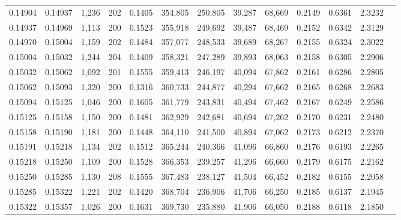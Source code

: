\begin{tabular}{rrrrrrrrrrrrr}
0.14904 & 0.14937 & 1,236 & 202 &                                     0.1405 & 354,805 & 250,805 &  39,287 &  68,669 & 0.2149 & 0.6361 & 2.3232 \\
0.14937 & 0.14969 & 1,113 & 200 &                                     0.1523 & 355,918 & 249,692 &  39,487 &  68,469 & 0.2152 & 0.6342 & 2.3129 \\
0.14970 & 0.15004 & 1,159 & 202 &                                     0.1484 & 357,077 & 248,533 &  39,689 &  68,267 & 0.2155 & 0.6324 & 2.3022 \\
0.15004 & 0.15032 & 1,244 & 204 &                                     0.1409 & 358,321 & 247,289 &  39,893 &  68,063 & 0.2158 & 0.6305 & 2.2906 \\
0.15032 & 0.15062 & 1,092 & 201 &                                     0.1555 & 359,413 & 246,197 &  40,094 &  67,862 & 0.2161 & 0.6286 & 2.2805 \\
0.15062 & 0.15093 & 1,320 & 200 &                                     0.1316 & 360,733 & 244,877 &  40,294 &  67,662 & 0.2165 & 0.6268 & 2.2683 \\
0.15094 & 0.15125 & 1,046 & 200 &                                     0.1605 & 361,779 & 243,831 &  40,494 &  67,462 & 0.2167 & 0.6249 & 2.2586 \\
0.15125 & 0.15158 & 1,150 & 200 &                                     0.1481 & 362,929 & 242,681 &  40,694 &  67,262 & 0.2170 & 0.6231 & 2.2480 \\
0.15158 & 0.15190 & 1,181 & 200 &                                     0.1448 & 364,110 & 241,500 &  40,894 &  67,062 & 0.2173 & 0.6212 & 2.2370 \\
0.15191 & 0.15218 & 1,134 & 202 &                                     0.1512 & 365,244 & 240,366 &  41,096 &  66,860 & 0.2176 & 0.6193 & 2.2265 \\
0.15218 & 0.15250 & 1,109 & 200 &                                     0.1528 & 366,353 & 239,257 &  41,296 &  66,660 & 0.2179 & 0.6175 & 2.2162 \\
0.15250 & 0.15285 & 1,130 & 208 &                                     0.1555 & 367,483 & 238,127 &  41,504 &  66,452 & 0.2182 & 0.6155 & 2.2058 \\
0.15285 & 0.15322 & 1,221 & 202 &                                     0.1420 & 368,704 & 236,906 &  41,706 &  66,250 & 0.2185 & 0.6137 & 2.1945 \\
0.15322 & 0.15357 & 1,026 & 200 &                                     0.1631 & 369,730 & 235,880 &  41,906 &  66,050 & 0.2188 & 0.6118 & 2.1850 \\

\end{tabular}
